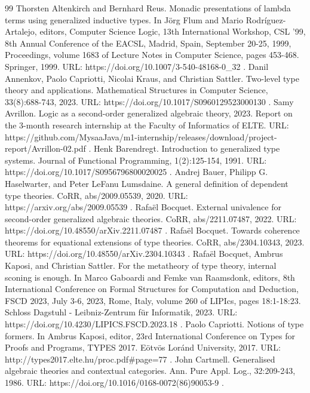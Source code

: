 \begin{thebibliography}{99}
 Thorsten Altenkirch and Bernhard Reus. Monadic presentations of lambda terms using generalized inductive types. In Jörg Flum and Mario Rodríguez-Artalejo, editors, Computer Science Logic, 13th International Workshop, CSL '99, 8th Annual Conference of the EACSL, Madrid, Spain, September 20-25, 1999, Proceedings, volume 1683 of Lecture Notes in Computer Science, pages 453-468. Springer, 1999. URL: https://doi.org/10.1007/3-540-48168-0\_32 .
 Danil Annenkov, Paolo Capriotti, Nicolai Kraus, and Christian Sattler. Two-level type theory and applications. Mathematical Structures in Computer Science, 33(8):688-743, 2023. URL: https://doi.org/10.1017/S0960129523000130 .
 Samy Avrillon. Logic as a second-order generalized algebraic theory, 2023. Report on the 3-month research internship at the Faculty of Informatics of ELTE. URL: https://github.com/MysaaJava/m1-internship/releases/download/project-report/Avrillon-02.pdf .
 Henk Barendregt. Introduction to generalized type systems. Journal of Functional Programming, 1(2):125-154, 1991. URL: https://doi.org/10.1017/S0956796800020025 .
 Andrej Bauer, Philipp G. Haselwarter, and Peter LeFanu Lumsdaine. A general definition of dependent type theories. CoRR, abs/2009.05539, 2020. URL: https://arxiv.org/abs/2009.05539 .
 Rafaël Bocquet. External univalence for second-order generalized algebraic theories. CoRR, abs/2211.07487, 2022. URL: https://doi.org/10.48550/arXiv.2211.07487 .
 Rafaël Bocquet. Towards coherence theorems for equational extensions of type theories. CoRR, abs/2304.10343, 2023. URL: https://doi.org/10.48550/arXiv.2304.10343 .
 Rafaël Bocquet, Ambrus Kaposi, and Christian Sattler. For the metatheory of type theory, internal sconing is enough. In Marco Gaboardi and Femke van Raamsdonk, editors, 8th International Conference on Formal Structures for Computation and Deduction, FSCD 2023, July 3-6, 2023, Rome, Italy, volume 260 of LIPIcs, pages 18:1-18:23. Schloss Dagstuhl - Leibniz-Zentrum für Informatik, 2023. URL: https://doi.org/10.4230/LIPICS.FSCD.2023.18 .
 Paolo Capriotti. Notions of type formers. In Ambrus Kaposi, editor, 23rd International Conference on Types for Proofs and Programs, TYPES 2017. Eötvös Loránd University, 2017. URL: http://types2017.elte.hu/proc.pdf\#page=77 .
 John Cartmell. Generalised algebraic theories and contextual categories. Ann. Pure Appl. Log., 32:209-243, 1986. URL: https://doi.org/10.1016/0168-0072(86)90053-9 .

\end{thebibliography}
